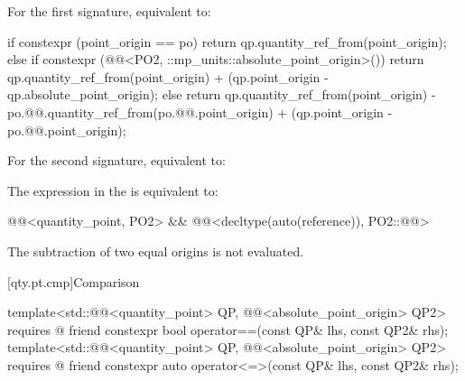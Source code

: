 \begin{itemdescr}
\pnum
\effects
For the first signature,
equivalent to:
\begin{codeblock}
if constexpr (point_origin == po)
  return qp.quantity_ref_from(point_origin);
else if constexpr (@@<PO2,
                                                     ::mp_units::absolute_point_origin>()) {
  return qp.quantity_ref_from(point_origin) + (qp.point_origin - qp.absolute_point_origin);
} else {
  return qp.quantity_ref_from(point_origin) -
         po.@@.quantity_ref_from(po.@@.point_origin) +
         (qp.point_origin - po.@@.point_origin);
}
\end{codeblock}
For the second signature,
equivalent to: 

\pnum
\remarks
The expression in the  is equivalent to:
\begin{codeblock}
@@<quantity_point, PO2{}> &&
  @@<decltype(auto(reference)), PO2::@@>
\end{codeblock}

\pnum
\recommended
The subtraction of two equal origins is not evaluated.
\end{itemdescr}

[qty.pt.cmp]{Comparison}

\begin{itemdecl}
template<std::@@<quantity_point> QP, @@<absolute_point_origin> QP2>
  requires @\seebelownc@
friend constexpr bool operator==(const QP& lhs, const QP2& rhs);
template<std::@@<quantity_point> QP, @@<absolute_point_origin> QP2>
  requires @\seebelownc@
friend constexpr auto operator<=>(const QP& lhs, const QP2& rhs);
\end{itemdecl}

